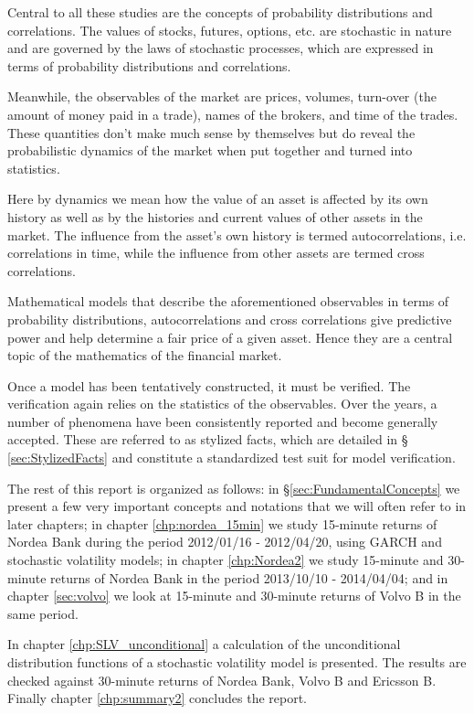 \documentclass{report}
\begin{document}
Central to all these studies are the concepts of probability
distributions and correlations. The values of stocks, futures,
options, etc. are stochastic in nature and are governed by the laws of
stochastic processes, which are expressed in terms of probability
distributions and correlations.

Meanwhile, the observables of the market are prices, volumes,
turn-over (the amount of money paid in a trade), names of the brokers,
and time of the trades. These quantities don't make much sense
by themselves but do reveal the probabilistic dynamics of the market
when put together and turned into statistics.

Here by dynamics we mean how the value of an asset is affected by its
own history as well as by the histories and current values of other
assets in the market. The influence from the asset's own history is
termed autocorrelations, i.e. correlations in time, while
the influence from other assets are termed cross correlations.

Mathematical models that describe the aforementioned observables in
terms of probability distributions, autocorrelations and cross
correlations give predictive power and help determine a fair price of
a given asset. Hence they are a central topic of the mathematics of
the financial market.

Once a model has been tentatively constructed, it must be
verified. The verification again relies on the statistics of the
observables. Over the years, a number of phenomena have been
consistently reported and become generally accepted. These are referred
to as stylized facts, which are detailed in \S
\ref{sec:StylizedFacts} and constitute a standardized test suit for
model verification.

The rest of this report is organized as follows: in
\S\ref{sec:FundamentalConcepts} we present a few very important
concepts and notations that we will often refer to in later
chapters; in chapter \ref{chp:nordea_15min} we study 15-minute returns
of Nordea Bank during the period 2012/01/16 - 2012/04/20, using GARCH
and stochastic volatility models; in chapter \ref{chp:Nordea2} we
study 15-minute and 30-minute returns of Nordea Bank in the period
2013/10/10 - 2014/04/04; and in chapter \ref{sec:volvo} we look at
15-minute and 30-minute returns of Volvo B in the same period.

In chapter \ref{chp:SLV_unconditional} a calculation of the
unconditional distribution functions of a stochastic volatility model
is presented. The results are checked against 30-minute returns of
Nordea Bank, Volvo B and Ericsson B. Finally chapter \ref{chp:summary2}
concludes the report.
\end{document}
